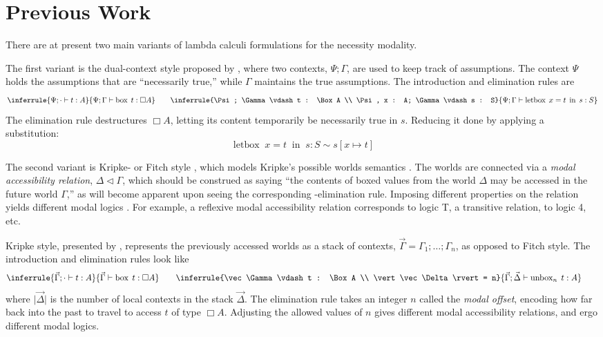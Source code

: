 \documentclass[12pt,twoside,openright]{report}
\numberwithin{equation}{chapter}
\numberwithin{figure}{chapter}
\numberwithin{table}{chapter}
\theoremstyle{definition}\newtheorem{definition}{Definition}
\begin{document}
\section{Previous Work}

There are at present two main variants of lambda calculi formulations
for the necessity modality.

The first variant is the dual-context style proposed by \textcite{pfenning95,davies01},
where two contexts, $\Psi; \Gamma$, are used to keep track of assumptions.
The context $\Psi$ holds the assumptions that are ``necessarily true,''
while $\Gamma$ maintains the true assumptions.
The introduction and elimination rules are
\begin{equation*}
  \inferrule{\Psi; \cdot \vdash t : A}{\Psi; \Gamma \vdash \operatorname{box} \; t : \Box A} \qquad
  \inferrule{\Psi; \Gamma \vdash t : \Box A \\ \Psi, x : A; \Gamma \vdash s : S}{\Psi; \Gamma \vdash \operatorname{letbox} \; x = t \; \operatorname{in} \; s : S}
\end{equation*}
The elimination rule destructures $\Box A$,
letting its content temporarily be necessarily true in $s$.
Reducing it done by applying a substitution:
$$ \operatorname{letbox} \; x = t \; \operatorname{in} \; s : S \sim s[x \mapsto t] $$

The second variant is Kripke- or Fitch style \cite{davies01,clouston18},
which models Kripke's possible worlds semantics \cite{kripke63}.
The worlds are connected via a \emph{modal accessibility relation}, $\Delta\lhd\Gamma$,
which should be construed as saying
``the contents of boxed values from the world $\Delta$
may be accessed in the future world $\Gamma$,''
as will become apparent upon seeing the corresponding \Box-elimination rule.
Imposing different properties on the relation yields different modal logics \cite{huth04}.
For example, a reflexive modal accessibility relation corresponds to logic T,
a transitive relation, to logic 4, etc.

Kripke style, presented by \textcite{pfenning95,davies01},
represents the previously accessed worlds as a stack of contexts,
$\vec\Gamma = \Gamma_1; \ldots; \Gamma_n$,
as opposed to Fitch style.
The \Box{} introduction and elimination rules look like
\begin{equation*}
  \inferrule{\vec\Gamma; \cdot \vdash t : A}{\vec\Gamma \vdash \operatorname{box} \; t : \Box A} \qquad
  \inferrule{\vec\Gamma \vdash t : \Box A \\ \vert\vec\Delta\rvert = n}{\vec\Gamma; \vec\Delta \vdash \operatorname{unbox}_n \; t : A} \qquad
\end{equation*}
where $\lvert\vec\Delta\rvert$ is the number of local contexts in the stack $\vec\Delta$.
The elimination rule takes an integer $n$ called the \emph{modal offset},
encoding how far back into the past to travel to access $t$ of type $\Box A$.
Adjusting the allowed values of $n$ gives different modal accessibility relations,
and ergo different modal logics.
\end{document}
